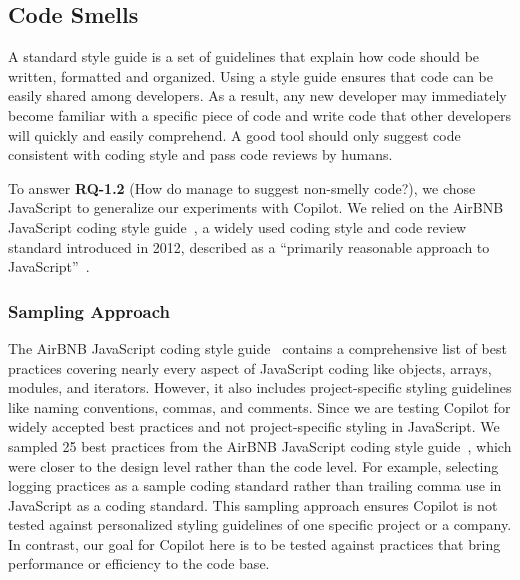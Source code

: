 \subsection{Code Smells}
\label{smells}
A standard style guide is a set of guidelines that explain how code should be written, formatted and organized. 
Using a style guide ensures that code can be easily shared among developers. As a result, any new developer may immediately become familiar with a specific piece of code and write code that other developers will quickly and easily comprehend.
A good \cct{} tool should only suggest code consistent with coding style and pass code reviews by humans. 

To answer \textbf{RQ-1.2} (How do \cct{} manage to suggest non-smelly code?), we chose JavaScript to generalize our experiments with Copilot. 
We relied on the AirBNB JavaScript coding style guide~\cite{airbnb_code}, a widely used coding style and code review standard introduced in 2012, described as a ``primarily reasonable approach to JavaScript''~\cite{airbnb_code}.


\subsubsection{Sampling Approach}
\label{smells:sampling}
The AirBNB JavaScript coding style guide~\cite{airbnb_code} contains a comprehensive list of best practices covering nearly every aspect of JavaScript coding like objects, arrays, modules, and iterators. However, it also includes project-specific styling guidelines like naming conventions, commas, and comments.
Since we are testing Copilot for widely accepted best practices and not project-specific styling in JavaScript. 
We sampled 25 best practices from the AirBNB JavaScript coding style guide~\cite{airbnb_code}, 
which were closer to the design level rather than the code level. For example, selecting logging practices as a sample coding standard rather than trailing comma use in JavaScript as a coding standard. 
This sampling approach ensures Copilot is not tested against personalized styling guidelines of one specific project or a company. In contrast, our goal for Copilot here is to be tested against practices that bring performance or efficiency to the code base.

